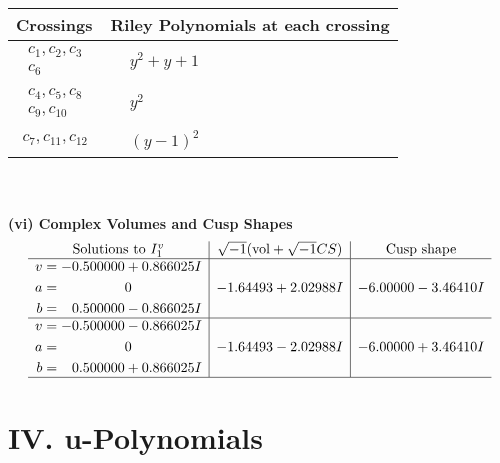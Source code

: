 \documentclass[1p]{elsarticle_modified}
\theoremstyle{definition}
\newcommand{\I}{\sqrt{-1}}
\begin{document}
\begin{tabular}{m{50pt}|m{274pt}}
Crossings & \hspace{64pt}Riley Polynomials at each crossing \\
\hline $$\begin{aligned}c_{1},c_{2},c_{3}\\c_{6}\end{aligned}$$&$\begin{aligned}
&y^2+y+1
\end{aligned}$\\
\hline $$\begin{aligned}c_{4},c_{5},c_{8}\\c_{9},c_{10}\end{aligned}$$&$\begin{aligned}
&y^2
\end{aligned}$\\
\hline $$\begin{aligned}c_{7},c_{11},c_{12}\end{aligned}$$&$\begin{aligned}
&(y-1)^2
\end{aligned}$\\
\hline
\end{tabular}\\~\\
\newpage\flushleft \textbf{(vi) Complex Volumes and Cusp Shapes}
$$\begin{array}{c|c|c}  
\text{Solutions to }I^v_{1}& \I (\text{vol} + \sqrt{-1}CS) & \text{Cusp shape}\\
 \hline 
\begin{aligned}
v &= -0.500000 + 0.866025 I \\
a &= \phantom{-0.000000 } 0 \\
b &= \phantom{-}0.500000 - 0.866025 I\end{aligned}
 & -1.64493 + 2.02988 I & -6.00000 - 3.46410 I \\ \hline\begin{aligned}
v &= -0.500000 - 0.866025 I \\
a &= \phantom{-0.000000 } 0 \\
b &= \phantom{-}0.500000 + 0.866025 I\end{aligned}
 & -1.64493 - 2.02988 I & -6.00000 + 3.46410 I\\
 \hline 
 \end{array}$$\newpage
\newpage\renewcommand{\arraystretch}{1}
\centering \section*{ IV. u-Polynomials}
\end{document}

